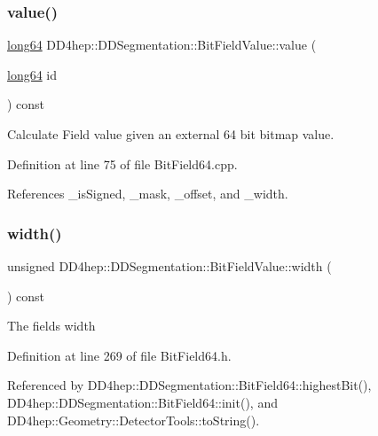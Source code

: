 \subsubsection{\texorpdfstring{value()}{value()}\hspace{0.1cm}{\footnotesize\ttfamily [2/2]}}
{\footnotesize\ttfamily \hyperlink{namespace_d_d4hep_ac2a70e722b33dc7ddaa20db8954ac836}{long64} D\+D4hep\+::\+D\+D\+Segmentation\+::\+Bit\+Field\+Value\+::value (\begin{DoxyParamCaption}\item[{\hyperlink{namespace_d_d4hep_ac2a70e722b33dc7ddaa20db8954ac836}{long64}}]{id }\end{DoxyParamCaption}) const}



Calculate Field value given an external 64 bit bitmap value. 



Definition at line 75 of file Bit\+Field64.\+cpp.



References \+\_\+is\+Signed, \+\_\+mask, \+\_\+offset, and \+\_\+width.

\hypertarget{class_d_d4hep_1_1_d_d_segmentation_1_1_bit_field_value_a2a64900a949635b4d1bbefe5a61529c3}{}\label{class_d_d4hep_1_1_d_d_segmentation_1_1_bit_field_value_a2a64900a949635b4d1bbefe5a61529c3} 
\subsubsection{\texorpdfstring{width()}{width()}}
{\footnotesize\ttfamily unsigned D\+D4hep\+::\+D\+D\+Segmentation\+::\+Bit\+Field\+Value\+::width (\begin{DoxyParamCaption}{ }\end{DoxyParamCaption}) const\hspace{0.3cm}{\ttfamily [inline]}}

The field\textquotesingle{}s width 

Definition at line 269 of file Bit\+Field64.\+h.



Referenced by D\+D4hep\+::\+D\+D\+Segmentation\+::\+Bit\+Field64\+::highest\+Bit(), D\+D4hep\+::\+D\+D\+Segmentation\+::\+Bit\+Field64\+::init(), and D\+D4hep\+::\+Geometry\+::\+Detector\+Tools\+::to\+String().




